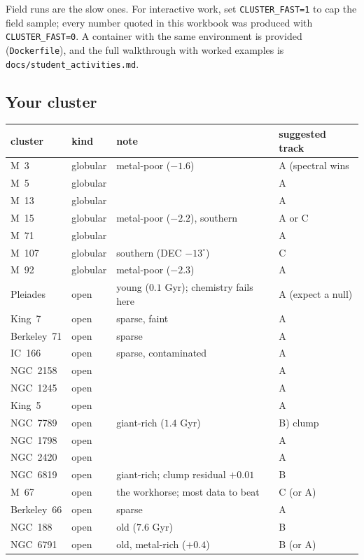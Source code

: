 Field runs are the slow ones. For interactive work, set \texttt{CLUSTER\_FAST=1}
to cap the field sample; every number quoted in this workbook was produced with
\texttt{CLUSTER\_FAST=0}. A container with the same environment is provided
(\texttt{Dockerfile}), and the full walkthrough with worked examples is
\texttt{docs/student\_activities.md}.

\subsection{Your cluster}

\begin{table}[htbp]
\centering
\small
{}
\begin{tabular}{@{}llll@{}} \toprule cluster & kind & note & suggested track \\
\midrule M~3 & globular & metal-poor ($-1.6$) & A (spectral wins \\ M~5 &
globular & & A \\ M~13 & globular & & A \\ M~15 & globular & metal-poor
($-2.2$), southern & A or C \\ M~71 & globular & & A \\ M~107 & globular &
southern (DEC $-13^\circ$) & C \\ M~92 & globular & metal-poor ($-2.3$) & A \\
Pleiades & open & young ($0.1$ Gyr); chemistry fails here & A (expect a null)
\\ King~7 & open & sparse, faint & A \\ Berkeley~71 & open & sparse & A \\
IC~166 & open & sparse, contaminated & A \\ NGC~2158 & open & & A \\ NGC~1245 &
open & & A \\ King~5 & open & & A \\ NGC~7789 & open & giant-rich ($1.4$ Gyr) &
B) clump \\ NGC~1798 & open & & A \\ NGC~2420 & open & & A \\ NGC~6819 & open &
giant-rich; clump residual $+0.01$ & B \\ M~67 & open & the workhorse; most
data to beat & C (or A) \\ Berkeley~66 & open & sparse & A \\ NGC~188 & open &
old ($7.6$ Gyr) & B \\ NGC~6791 & open & old, metal-rich ($+0.4$) & B (or A) \\

\end{tabular}
\end{table}
